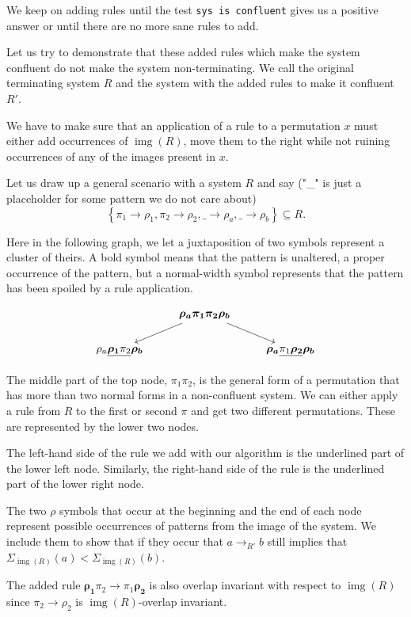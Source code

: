 \documentclass[a4paper, 11pt, english]{article}
\newcommand{\patternrule}{ \to \!}
\theoremstyle{definition}
\DeclareMathOperator{\img}{img}
\begin{document}
We keep on adding rules until the test \verb|sys is confluent| gives us a positive answer
or until there are no more sane rules to add.

Let us try to demonstrate that these added rules which make the system confluent do
not make the system non-terminating.
We call the original terminating system $R$ and the system with the added rules to make it confluent
$R'$.
 
We have to make sure that an application of a rule to a permutation $x$ must either add occurrences of $\img(R)$, move them
to the right while not ruining occurrences of any of the images present in $x$.

Let us draw up a general scenario with a system $R$ and say ("\_" is just a placeholder for some
pattern we do not care about)
\[
  \left\{ \pi_1 \patternrule \rho_1, \pi_2 \patternrule \rho_2, 
  \_ \patternrule \rho_a, \_ \patternrule \rho_b \right\} \subseteq R.
\]

Here in the following graph, we let a juxtaposition of two symbols represent a cluster of theirs. A bold
symbol means that the pattern is unaltered, a proper occurrence of the pattern, but a normal-width
symbol represents that the pattern has been spoiled by a rule application.

\[
\begin{tikzcd}  
    & \bm{\rho_a \pi_1 \pi_2 \rho_b} \arrow[dl] \arrow[dr] & \\
    \rho_a \underline{\bm{\rho_1}\pi_2}\bm{\rho_b} & & \bm{\rho_a}\underline{\pi_1 \bm{\rho_2}} \bm{\rho_b}
\end{tikzcd}
\]

The middle part of the top node, $\pi_1\pi_2$, is the general form of a permutation that has more than two normal forms in
a non-confluent system. We can either apply a rule from $R$ to the first or second $\pi$ and get two different
permutations. These are represented by the lower two nodes.

The left-hand side of the rule we add with our algorithm is the underlined part of the lower left
node. Similarly, the right-hand side of the rule is the underlined part of the lower right node.

The two $\rho$ symbols that occur at the beginning and the end of each node represent possible
occurrences of patterns from the image of the system. We include them to show that if they occur
that $a \to_{R'} b$ still implies that $\Sigma_{\img(R)}(a) < \Sigma_{\img(R)}(b)$.

The added rule $\bm{\rho_1} \pi_2 \patternrule \pi_1 \bm{\rho_2}$ is also
overlap invariant with respect to $\img(R)$ since $\pi_2 \patternrule \rho_2$ is $\img(R)$-overlap invariant.
\end{document}
